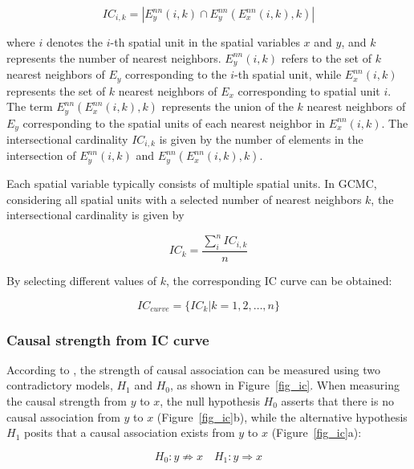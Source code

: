 \documentclass[authoryear,preprint,review,12pt]{elsarticle}
\begin{document}
\begin{equation}\label{eq-ic_ik}
IC_{i,k} = \left| E_y^{nn}(i,k) \cap E_y^{nn}(E_x^{nn}(i,k),k)\right|
\end{equation}

\noindent where \(i\) denotes the \(i\)-th spatial unit in the spatial variables \(x\) and \(y\), and \(k\) represents the number of nearest neighbors. \(E_y^{nn}(i,k)\) refers to the set of \(k\) nearest neighbors of \(E_y\) corresponding to the \(i\)-th spatial unit, while \(E_x^{nn}(i,k)\) represents the set of \(k\) nearest neighbors of \(E_x\) corresponding to spatial unit \(i\). The term \(E_y^{nn}(E_x^{nn}(i,k),k)\) represents the union of the \(k\) nearest neighbors of \(E_y\) corresponding to the spatial units of each nearest neighbor in \(E_x^{nn}(i,k)\). The intersectional cardinality \(IC_{i,k}\) is given by the number of elements in the intersection of \(E_y^{nn}(i,k)\) and \(E_y^{nn}(E_x^{nn}(i,k),k)\).

Each spatial variable typically consists of multiple spatial units. In GCMC, considering all spatial units with a selected number of nearest neighbors \(k\), the intersectional cardinality is given by

\begin{equation}\label{eq-ic_k}
IC_k = \frac{\sum_i^n IC_{i,k}}{n}
\end{equation}

By selecting different values of \(k\), the corresponding IC curve can be obtained:

\begin{equation}\label{eq-ic_curve}
IC_{curve} = \{IC_{k} | k = 1, 2, \dots, n\}
\end{equation}

\subsubsection{Causal strength from IC curve}

According to \cite{tao2023cmc}, the strength of causal association can be measured using two contradictory models, \(H_1\) and \(H_0\), as shown in Figure~\ref{fig_ic}. When measuring the causal strength from \(y\) to \(x\), the null hypothesis \(H_0\) asserts that there is no causal association from \(y\) to \(x\) (Figure~\ref{fig_ic}b), while the alternative hypothesis \(H_1\) posits that a causal association exists from \(y\) to \(x\) (Figure~\ref{fig_ic}a):

\begin{equation}\label{eq-hypothesis}
H_0: y \not\Rightarrow x\quad 
H_1: y \Rightarrow x 
\end{equation}
\end{document}
